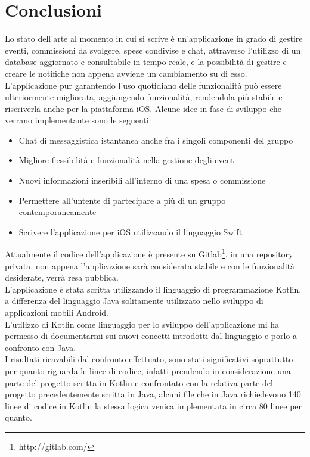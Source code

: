 \chapter*{Conclusioni}

Lo stato dell'arte al momento in cui si scrive \`e un'applicazione in grado di gestire eventi, commissioni da svolgere, spese condivise e chat, attraverso l'utilizzo di un database aggiornato e consultabile in tempo reale, e la possibilità di gestire e creare le notifiche non appena avviene un cambiamento su di esso.\\
L'applicazione pur garantendo l'uso quotidiano delle funzionalità può essere ulteriormente migliorata, aggiungendo funzionalità, rendendola più stabile e riscriverla anche per la piattaforma iOS. Alcune idee in fase di sviluppo che verrano implementante sono le seguenti:
\begin{itemize}
  \item Chat di messaggistica istantanea anche fra i singoli componenti del gruppo
  \item Migliore flessibilità e funzionalità nella gestione degli eventi
  \item Nuovi informazioni inseribili all'interno di una spesa o commissione
  \item Permettere all'untente di partecipare a più di un gruppo contemporaneamente
  \item Scrivere l'applicazione per iOS utilizzando il linguaggio Swift
\end{itemize}
Attualmente il codice dell'applicazione è presente su Gitlab\footnote{http://gitlab.com/}, in una repository privata, non appena l'applicazione sarà considerata stabile e con le funzionalità desiderate, verrà resa pubblica.\\
L'applicazione è stata scritta utilizzando il linguaggio di programmazione Kotlin, a differenza del linguaggio Java solitamente utilizzato nello sviluppo di applicazioni mobili Android.\\ L'utilizzo di Kotlin come linguaggio per lo sviluppo dell'applicazione mi ha permesso di documentarmi sui nuovi concetti introdotti dal linguaggio e porlo a confronto con Java.\\
I risultati ricavabili dal confronto effettuato, sono stati significativi soprattutto per quanto riguarda le linee di codice, infatti prendendo in considerazione una parte del progetto scritta in Kotlin e confrontato con la relativa parte del progetto precedentemente scritta in Java, alcuni file che in Java richiedevono 140 linee di codice in Kotlin la stessa logica venica implementata in circa 80 linee per quanto.

